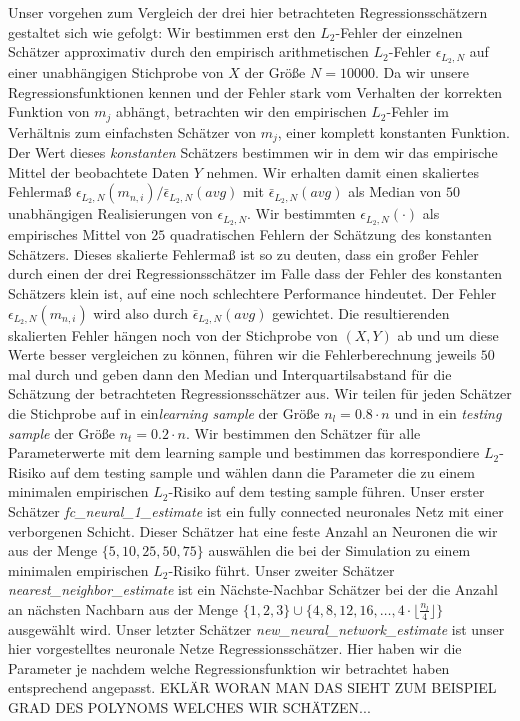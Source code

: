 Unser vorgehen zum Vergleich der drei hier betrachteten Regressionsschätzern gestaltet sich wie gefolgt:
Wir bestimmen erst den $L_2$-Fehler der einzelnen Schätzer approximativ durch den empirisch arithmetischen $L_2$-Fehler $\epsilon_{L_2,N}$ auf einer unabhängigen Stichprobe von $X$ der Größe $N = 10000$. Da wir unsere Regressionsfunktionen kennen und der Fehler stark vom Verhalten der korrekten Funktion von $m_j$ abhängt, betrachten wir den empirischen $L_2$-Fehler im Verhältnis zum einfachsten Schätzer von $m_j$, einer komplett konstanten Funktion. Der Wert dieses \textit{konstanten} Schätzers bestimmen wir in dem wir das empirische Mittel der beobachtete Daten $Y$ nehmen. Wir erhalten damit einen skaliertes Fehlermaß $\epsilon_{L_2,N}(m_{n,i})/\bar{\epsilon}_{L_2,N}(avg)$ mit $\bar{\epsilon}_{L_2,N}(avg)$ als Median von $50$ unabhängigen Realisierungen von $\epsilon_{L_2,N}$. Wir bestimmten $\epsilon_{L_2,N}(\cdot)$ als empirisches Mittel von $25$ quadratischen Fehlern der Schätzung des konstanten Schätzers. Dieses skalierte Fehlermaß ist so zu deuten, dass ein großer Fehler durch einen der drei Regressionsschätzer im Falle dass der Fehler des konstanten Schätzers klein ist, auf eine noch schlechtere Performance hindeutet. Der Fehler $\epsilon_{L_2,N}(m_{n,i})$ wird also durch $\bar{\epsilon}_{L_2,N}(avg)$ gewichtet.
Die resultierenden skalierten Fehler hängen noch von der Stichprobe von $(X, Y)$ ab und um diese Werte besser vergleichen zu können, führen wir die Fehlerberechnung jeweils $50$ mal durch und geben dann den Median und Interquartilsabstand für die Schätzung der betrachteten Regressionsschätzer aus.
Wir teilen für jeden Schätzer die Stichprobe auf in ein\textit{learning sample} der Größe $n_l = 0.8 \cdot n$ und in ein \textit{testing sample} der Größe $n_t = 0.2 \cdot n$. Wir bestimmen den Schätzer für alle Parameterwerte mit dem learning sample und bestimmen das korrespondiere $L_2$-Risiko auf dem testing sample und wählen dann die Parameter die zu einem minimalen empirischen $L_2$-Risiko auf dem testing sample führen.
Unser erster Schätzer \textit{fc\_neural\_1\_estimate} ist ein fully connected neuronales Netz mit einer verborgenen Schicht. Dieser Schätzer hat eine feste Anzahl an Neuronen die wir aus der Menge $\{5, 10, 25, 50, 75\}$ auswählen die bei der Simulation zu einem minimalen empirischen $L_2$-Risiko führt.
Unser zweiter Schätzer \textit{nearest\_neighbor\_estimate} ist ein Nächste-Nachbar Schätzer bei der die Anzahl an nächsten Nachbarn aus der Menge $\{1, 2, 3\} \cup \{4, 8, 12, 16, \dots, 4 \cdot \lfloor\frac{n_l}{4}\rfloor\}$ ausgewählt wird.
Unser letzter Schätzer \textit{new\_neural\_network\_estimate} ist unser hier vorgestelltes neuronale Netze Regressionsschätzer. Hier haben wir die Parameter je nachdem welche Regressionsfunktion wir betrachtet haben entsprechend angepasst. EKLÄR WORAN MAN DAS SIEHT ZUM BEISPIEL GRAD DES POLYNOMS WELCHES WIR SCHÄTZEN...

